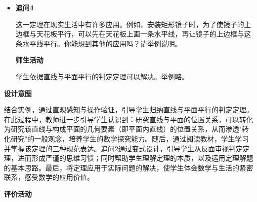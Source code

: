 \documentclass[UTF8,a4paper,12pt,twoside]{ctexart}
\begin{document}
\begin{enumerate}
\begin{itemize}
学生可以得出思路是直线与平面平行问题转化为直线与直线平行问题，判定定理本质上反映了直线与平面的组成元素（把平面看成是由直线组成的）之间特定的位置关系。

    \item \textbf{追问4}

这一定理在现实生活中有许多应用。例如，安装矩形镜子时，为了使镜子的上边框与天花板平行，可以先在天花板上画一条水平线，再让镜子的上边框与这条水平线平行。你能想到其他的应用吗？请举例说明。

\textbf{师生活动}

学生依据直线与平面平行的判定定理可以解决。举例略。
\end{itemize}

\textbf{设计意图}

结合实例，通过直观感知与操作验证，引导学生归纳直线与平面平行的判定定理。在此过程中，教师进一步引导学生认识到：研究直线与平面的位置关系，可以转化为研究该直线与构成平面的几何要素（即平面内直线）的位置关系，从而渗透"转化研究"的一般观念，培养学生的数学探究能力。随后，通过阅读教材，学生学习并掌握该定理的三种规范表达。追问2通过变式设计，引导学生从反面审视判定定理，进而形成严谨的思维习惯；同时帮助学生理解定理的本质，以及运用定理解题的基本思路。最后，将定理应用于实际问题的解决，使学生体会数学与生活的紧密联系，感受数学的应用价值。

\textbf{评价活动}


\end{enumerate}
\end{document}
